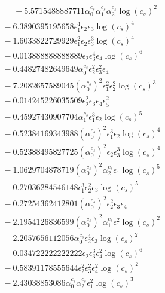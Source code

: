 \documentclass[10pt]{article}
\begin{document}
\begin{align*}
\phantom{F_{s,6}} &\phantom{={}}{}  - 5.5715488887711 \alpha_{0}^{c_s} \alpha_{1}^{c_s} \alpha_{2}^{c_s} \log{\left(c_{s} \right)}^{2} \\
&{}  - 6.3890395195658 \epsilon_{1}^{4} \epsilon_{2} \epsilon_{3} \log{\left(c_{s} \right)}^{4} \\
&{}  - 1.6033822729929 \epsilon_{1}^{2} \epsilon_{2} \epsilon_{3}^{3} \log{\left(c_{s} \right)}^{4} \\
&{}  - 0.013888888888889 \epsilon_{2} \epsilon_{3}^{4} \epsilon_{4} \log{\left(c_{s} \right)}^{6} \\
&{}  - 0.44827482649649 \alpha_{0}^{c_s} \epsilon_{2}^{2} \epsilon_{3}^{2} \epsilon_{4} \\
&{}  - 7.2082657589045 \left(\alpha_{0}^{c_s}\right)^{2} \epsilon_{1}^{2} \epsilon_{2}^{2} \log{\left(c_{s} \right)}^{3} \\
&{}  - 0.014245226035509 \epsilon_{2}^{2} \epsilon_{3} \epsilon_{4} \epsilon_{5}^{2} \\
&{}  - 0.45927430907704 \alpha_{1}^{c_s} \epsilon_{1}^{3} \epsilon_{2} \log{\left(c_{s} \right)}^{5} \\
&{}  - 0.52384169343988 \left(\alpha_{0}^{c_s}\right)^{2} \epsilon_{1}^{3} \epsilon_{2} \log{\left(c_{s} \right)}^{4} \\
&{}  - 0.52388495827725 \left(\alpha_{0}^{c_s}\right)^{2} \epsilon_{2} \epsilon_{3}^{3} \log{\left(c_{s} \right)}^{4} \\
&{}  - 1.0629704878719 \left(\alpha_{0}^{c_s}\right)^{2} \alpha_{2}^{c_s} \epsilon_{1} \log{\left(c_{s} \right)}^{5} \\
&{}  - 0.27036284546148 \epsilon_{1}^{3} \epsilon_{2}^{2} \epsilon_{3} \log{\left(c_{s} \right)}^{5} \\
&{}  - 0.27254362412801 \left(\alpha_{0}^{c_s}\right)^{2} \epsilon_{2}^{2} \epsilon_{3} \epsilon_{4} \\
&{}  - 2.1954126836599 \left(\alpha_{0}^{c_s}\right)^{2} \alpha_{1}^{c_s} \epsilon_{1}^{2} \log{\left(c_{s} \right)}^{2} \\
&{}  - 2.2057656112056 \alpha_{0}^{c_s} \epsilon_{2}^{4} \epsilon_{3} \log{\left(c_{s} \right)}^{2} \\
&{}  - 0.034722222222222 \epsilon_{2} \epsilon_{3}^{3} \epsilon_{4}^{2} \log{\left(c_{s} \right)}^{6} \\
&{}  - 0.58391178555644 \epsilon_{2}^{2} \epsilon_{3}^{2} \epsilon_{4}^{2} \log{\left(c_{s} \right)}^{2} \\
&{}  - 2.43038853086 \alpha_{0}^{c_s} \alpha_{2}^{c_s} \epsilon_{1}^{2} \log{\left(c_{s} \right)}^{3} \\

\end{align*}
\end{document}

